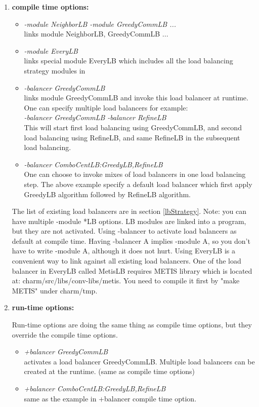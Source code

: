 \begin{enumerate}
\item {\bf compile time options:}

\begin{itemize}
\item {\em -module NeighborLB -module GreedyCommLB ...}  \\
  links module NeighborLB, GreedyCommLB ...
\item {\em -module EveryLB} \\
  links special module EveryLB which includes all the load balancing strategy modules in \charmpp{}
\item {\em -balancer GreedyCommLB} \\
  links module GreedyCommLB and invoke this load balancer at runtime. One can specify multiple load balancers for example: \\
   {\em -balancer GreedyCommLB -balancer RefineLB}   \\
   This will start first load balancing using GreedyCommLB, and second load balancing using RefineLB, and same RefineLB in the subsequent load balancing.
\item {\em -balancer ComboCentLB:GreedyLB,RefineLB}  \\
   One can choose to invoke mixes of load balancers in one load balancing step. The above example specify a default load balancer which first apply GreedyLB algorithm followed by RefineLB algorithm.
\end{itemize}

The list of existing load balancers are in section \ref{lbStrategy}.
Note: you can have multiple -module *LB options. LB modules are
linked into a program, but they are not activated.
Using -balancer to activate load balancers as default at compile time. 
Having -balancer A implies -module A, so you don't have to write -module A, 
although it does not hurt.
Using EveryLB is a convenient way to link against all existing load balancers. 
One of the load balancer in EveryLB called MetisLB requires METIS library 
which is located at: charm/src/libs/conv-libs/metis. 
You need to compile it first by "make METIS" under charm/tmp.

\item {\bf run-time options:}

Run-time options are doing the same thing as compile time options, but they override the compile time options.

\begin{itemize}
\item {\em +balancer GreedyCommLB} \\
  activates a load balancer GreedyCommLB. Multiple load balancers can be created at the runtime. (same as compile time options)
\item {\em +balancer ComboCentLB:GreedyLB,RefineLB}  \\
  same as the example in +balancer compile time option.
\end{itemize}


\end{enumerate}
